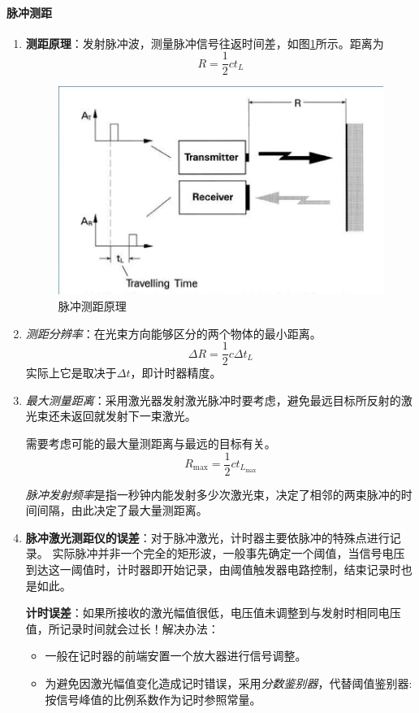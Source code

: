 \paragraph{脉冲测距}
\begin{enumerate}
	\item \textbf{测距原理}：发射脉冲波，测量脉冲信号往返时间差，如图\ref{fig:脉冲测距原理}所示。距离为
		\begin{equation}
		R = \dfrac{1}{2}ct_L
		\end{equation}
		\begin{figure}[htbp]
			\centering
			\includegraphics[width=0.5\linewidth]{figure/Chapter3/脉冲测距原理}
			\caption{脉冲测距原理}
			\label{fig:脉冲测距原理}
		\end{figure}
	\item \textit{测距分辨率}：在光束方向能够区分的两个物体的最小距离。
		\begin{equation}
		\Delta R = \dfrac{1}{2}c\Delta t_L
		\end{equation}
		实际上它是取决于$ \Delta t $，即计时器精度。
	\item \textit{最大测量距离}：采用激光器发射激光脉冲时要考虑，避免最远目标所反射的激光束还未返回就发射下一束激光。
	
		需要考虑可能的最大量测距离与最远的目标有关。
		\begin{equation}
		R_{\max} = \dfrac{1}{2}ct_{L_{\max}}
		\end{equation}
		
		\textit{脉冲发射频率}是指一秒钟内能发射多少次激光束，决定了相邻的两束脉冲的时间间隔，由此决定了最大量测距离。
	\item \textbf{脉冲激光测距仪的误差}：对于脉冲激光，计时器主要依脉冲的特殊点进行记录。
		实际脉冲并非一个完全的矩形波，一般事先确定一个阈值，当信号电压到达这一阈值时，计时器即开始记录，由阈值触发器电路控制，结束记录时也是如此。
		
		\textbf{计时误差}：如果所接收的激光幅值很低，电压值未调整到与发射时相同电压值，所记录时间就会过长！解决办法：
			\begin{itemize}
				\item 一般在记时器的前端安置一个放大器进行信号调整。
				\item 为避免因激光幅值变化造成记时错误，采用\textit{分数鉴别器}，代替阈值鉴别器: 按信号峰值的比例系数作为记时参照常量。
			\end{itemize}
\end{enumerate} %

